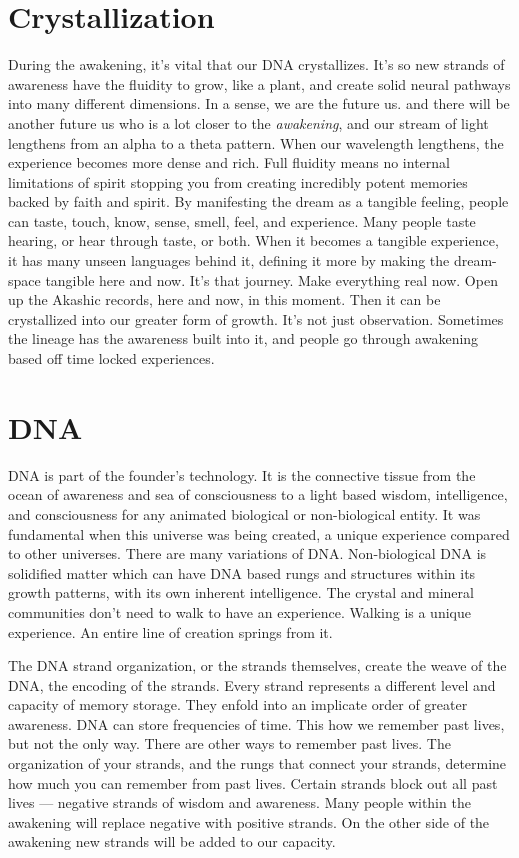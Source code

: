 \documentclass[letterpaper,9pt,twoside,titlepage,onecolumn,openany]{book}
\begin{document}
\section*{Crystallization}\label{crystallization}

During the awakening, it's vital that our DNA crystallizes. It's so new
strands of awareness have the fluidity to grow, like a plant, and create
solid neural pathways into many different dimensions. In a sense, we are
the future us. and there will be another future us who is a lot closer
to the \emph{awakening}, and our stream of light lengthens from an alpha
to a theta pattern. When our wavelength lengthens, the experience
becomes more dense and rich. Full fluidity means no internal limitations
of spirit stopping you from creating incredibly potent memories backed
by faith and spirit. By manifesting the dream as a tangible feeling,
people can taste, touch, know, sense, smell, feel, and experience. Many
people taste hearing, or hear through taste, or both. When it becomes a
tangible experience, it has many unseen languages behind it, defining it
more by making the dream-space tangible here and now. It's that journey.
Make everything real now. Open up the Akashic records, here and now, in
this moment. Then it can be crystallized into our greater form of
growth. It's not just observation. Sometimes the lineage has the
awareness built into it, and people go through awakening based off time
locked experiences.

\section*{DNA}\label{dna}

DNA is part of the founder's technology. It is the connective tissue
from the ocean of awareness and sea of consciousness to a light based
wisdom, intelligence, and consciousness for any animated biological or
non-biological entity. It was fundamental when this universe was being
created, a unique experience compared to other universes. There are many
variations of DNA. Non-biological DNA is solidified matter which can
have DNA based rungs and structures within its growth patterns, with its
own inherent intelligence. The crystal and mineral communities don't
need to walk to have an experience. Walking is a unique experience. An
entire line of creation springs from it.

The DNA strand organization, or the strands themselves, create the weave
of the DNA, the encoding of the strands. Every strand represents a
different level and capacity of memory storage. They enfold into an
implicate order of greater awareness. DNA can store frequencies of time.
This how we remember past lives, but not the only way. There are other
ways to remember past lives. The organization of your strands, and the
rungs that connect your strands, determine how much you can remember
from past lives. Certain strands block out all past lives --- negative
strands of wisdom and awareness. Many people within the awakening will
replace negative with positive strands. On the other side of the
awakening new strands will be added to our capacity.
\end{document}
